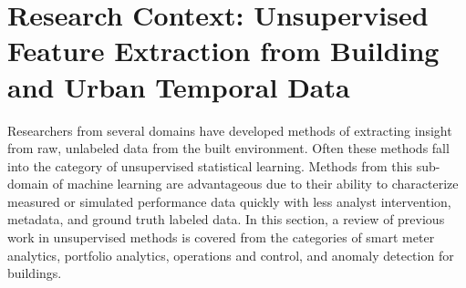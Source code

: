 \section{Research Context: Unsupervised Feature Extraction from Building and Urban Temporal Data}
\label{sec:litreview}

Researchers from several domains have developed methods of extracting insight from raw, unlabeled data from the built environment. Often these methods fall into the category of unsupervised statistical learning. Methods from this sub-domain of machine learning are advantageous due to their ability to characterize measured or simulated performance data quickly with less analyst intervention, metadata, and ground truth labeled data. In this section, a review of previous work in unsupervised methods is covered from the categories of smart meter analytics, portfolio analytics, operations and control, and anomaly detection for buildings. 
